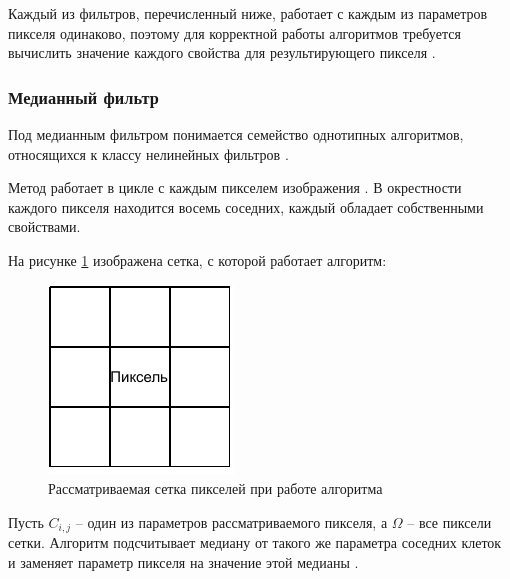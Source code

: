 Каждый из фильтров, перечисленный ниже, работает с каждым из параметров пикселя одинаково, поэтому для корректной работы алгоритмов требуется вычислить значение каждого свойства для результирующего пикселя \cite{filterTechincs}.

\newpage
\subsubsection{Медианный фильтр}
Под медианным фильтром понимается семейство однотипных алгоритмов, относящихся к классу нелинейных фильтров \cite{median}.

Метод работает в цикле с каждым пикселем изображения \cite{filterTechincs}. 
В окрестности каждого пикселя находится восемь соседних, каждый обладает собственными свойствами. 

На рисунке \ref{fig::grid} изображена сетка, с которой работает алгоритм:

\FloatBarrier
\begin{figure}[h]	
	\begin{center}
		\includegraphics[]{inc/pdf/grid.pdf}
	\end{center}
	\captionsetup{justification=centering}
	\caption{Рассматриваемая сетка пикселей при работе алгоритма}
	\label{fig::grid}
\end{figure}
\FloatBarrier

Пусть $C_{i, j}$ -- один из параметров рассматриваемого пикселя, а $\Omega$ -- все пиксели сетки.
Алгоритм подсчитывает медиану от такого же параметра соседних клеток и заменяет параметр пикселя на значение этой медианы \cite{median}.

